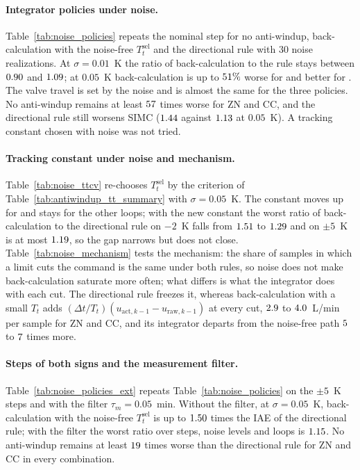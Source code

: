\documentclass[11pt]{article}
\begin{document}


\paragraph{Integrator policies under noise.} Table~\ref{tab:noise_policies} repeats the nominal step for no anti-windup, back-calculation with the noise-free $T_t^{\mathrm{sel}}$ and the directional rule with $30$ noise realizations. At $\sigma = 0.01$~K the ratio of back-calculation to the rule stays between $0.90$ and $1.09$; at $0.05$~K back-calculation is up to $51\%$ worse for \vnzbcworse{} and better for \vnzbcbetter{}. The valve travel is set by the noise and is almost the same for the three policies. No anti-windup remains at least $57$ times worse for ZN and CC, and the directional rule still worsens SIMC ($1.44$ against $1.13$ at $0.05$~K). A tracking constant chosen with noise was not tried.



\paragraph{Tracking constant under noise and mechanism.} Table~\ref{tab:noise_ttcv} re-chooses $T_t^{\mathrm{sel}}$ by the criterion of Table~\ref{tab:antiwindup_tt_summary} with $\sigma = 0.05$~K. The constant moves up for \vnzttchanged{} and stays for the other loops; with the new constant the worst ratio of back-calculation to the directional rule on $-2$~K falls from $1.51$ to $1.29$ and on $\pm 5$~K is at most $1.19$, so the gap narrows but does not close. Table~\ref{tab:noise_mechanism} tests the mechanism: the share of samples in which a limit cuts the command is the same under both rules, so noise does not make back-calculation saturate more often; what differs is what the integrator does with each cut. The directional rule freezes it, whereas back-calculation with a small $T_t$ adds $(\Delta t/T_t)(u_{\text{act},k-1} - u_{\text{raw},k-1})$ at every cut, $2.9$ to $4.0$~L/min per sample for ZN and CC, and its integrator departs from the noise-free path $5$ to $7$ times more.





\paragraph{Steps of both signs and the measurement filter.} Table~\ref{tab:noise_policies_ext} repeats Table~\ref{tab:noise_policies} on the $\pm 5$~K steps and with the filter $\tau_m = 0.05$~min. Without the filter, at $\sigma = 0.05$~K, back-calculation with the noise-free $T_t^{\mathrm{sel}}$ is up to $1.50$ times the IAE of the directional rule; with the filter the worst ratio over steps, noise levels and loops is $1.15$. No anti-windup remains at least $19$ times worse than the directional rule for ZN and CC in every combination.
\end{document}
